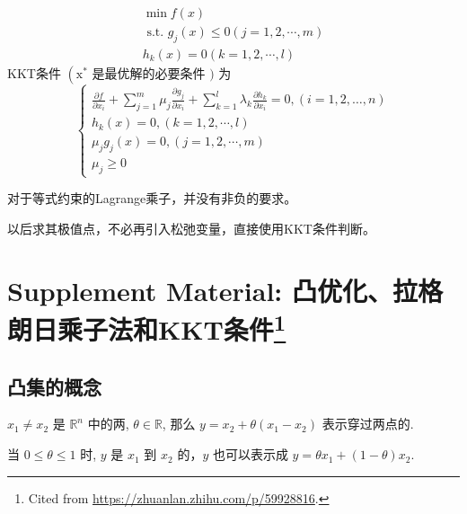 \begin{theorem}[同时包含等式和不等式约束的一般优化问题的KKT条件]
    $$
\begin{array}{l}
\min f({x}) \\
\text { s.t. } g_{j}({x}) \leq 0(j=1,2, \cdots, m) \\
h_{k}({x})=0(k=1,2, \cdots, l)
\end{array}
$$
KKT条件 $ \left(\mathrm{x}^{*}\right. $ 是最优解的必要条件 $ ) $ 为
$$
\left\{\begin{array}{l}
\frac{\partial f}{\partial x_{i}}+\sum_{j=1}^{m} \mu_{j} \frac{\partial g_{j}}{\partial x_{i}}+\sum_{k=1}^{l} \lambda_{k} \frac{\partial h_{k}}{\partial x_{i}}=0,(i=1,2, \ldots, n) \\
h_{k}({x})=0,(k=1,2, \cdots, l) \\
\mu_{j} g_{j}({x})=0,(j=1,2, \cdots, m) \\
\mu_{j} \geq 0
\end{array}\right.
$$
\end{theorem}

\begin{remark}
    对于等式约束的Lagrange乘子，并没有非负的要求。
\end{remark}

\begin{remark}
    以后求其极值点，不必再引入松弛变量，直接使用KKT条件判断。
\end{remark}


\section[Supplement Material: 凸优化、拉格朗日乘子法和KKT条件]{Supplement Material: 凸优化、拉格朗日乘子法和KKT条件\footnote{Cited from \url{https://zhuanlan.zhihu.com/p/59928816}.}}

\subsection{凸集的概念}

\begin{definition}[点、（直）线、线段]
    $ x_{1} \neq x_{2} $ 是 $ \mathbb{R}^{n} $ 中的两, $ \theta \in \mathbb{R} $, 那么 $ y=x_{2}+\theta\left(x_{1}-x_{2}\right) $ 表示穿过两点的.

    当 $ 0 \leqslant \theta \leqslant 1 $ 时, $ y $ 是 $ x_{1} $ 到 $ x_{2} $ 的，$ y $ 也可以表示成 $ y=\theta x_{1}+(1-\theta) x_{2} $.
\end{definition}

